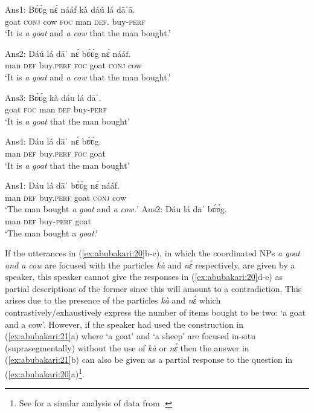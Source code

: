 \documentclass[output=paper,modfonts,nonflat,
\ChapterDOI{10.5281/zenodo.3367154}
 hidelinks
]{langsci/langscibook}
\begin{document}
\ex\label{ex:abubakari:20b}
Ans1: \gll Bʋ́ʋ́g  nɛ́  nááf  kà  dáú  lá  dāˈā.\\
goat    \textsc{conj}  cow  \textsc{foc}  man  \textsc{def}.  buy-\textsc{perf}\\
\glt ‘It is \textit{a} \textit{goat} and \textit{a} \textit{cow} that the man bought.’

\ex\label{ex:abubakari:20c}
Ans2: \gll Dáú  lá  dāˈ    nɛ́  bʋ́ʋ́g  nɛ́  nááf.\\
man  \textsc{def}  buy.\textsc{perf}  \textsc{foc}  goat  \textsc{conj}  cow \\
\glt ‘It is \textit{a} \textit{goat} and \textit{a} \textit{cow} that the man bought.’

\ex\label{ex:abubakari:20d}
Ans3: \gll {\#}Bʋ́ʋ́g  kà  dáu  lá  dāˈ.\\ 
goat    \textsc{foc}  man  \textsc{def}  buy-\textsc{perf}\\                           
\glt ‘It is \textit{a goat} that the man bought’          

\ex\label{ex:abubakari:20e}
Ans4: \gll {\#}Dáu  lá  dāˈ    nɛ́  bʋ́ʋ́g.\\   
man  \textsc{def}  buy.\textsc{perf}  \textsc{foc}  goat\\
\glt ‘It is \textit{a} \textit{goat} that the man bought’
\z
\z

\ea\label{ex:abubakari:21}
\ea\label{ex:abubakari:21a}
Ans1: \gll Dáu  lá  dāˈ    bʋ́ʋ́g  nɛ́  nááf.\\
man  \textsc{def}  buy.\textsc{perf}  goat  \textsc{conj}  cow\\                 
\glt ‘The man bought \textit{a} \textit{goat} and \textit{a} \textit{cow.}’     
\ex\label{ex:abubakari:21b}
Ans2: \gll Dáu  lá  dāˈ    bʋ́ʋ́g.\\  
man  \textsc{def}  buy-\textsc{perf}  goat\\  
\glt ‘The man bought {a} \textit{goat}.’
\z
\z

If the utterances in (\ref{ex:abubakari:20}b-c), in which the coordinated NPs \textit{a goat and a cow} are focused with the particles \textit{kà} and \textit{nɛ́} respectively, are given by a speaker, this speaker cannot give the responses in (\ref{ex:abubakari:20}d-e) as partial descriptions of the former since this will amount to a contradiction. This arises due to the presence of the particles \textit{kà} and \textit{nɛ́} which contrastively{\slash}exhaustively express the number of items bought to be two: 
`a goat and a cow'. However, if the speaker had used the construction in (\ref{ex:abubakari:21}a) where `a goat' and `a sheep' are focused in-situ (suprasegmentally) without the use of \textit{kà} or \textit{nɛ́} then the answer in (\ref{ex:abubakari:21}b) can also be given as a partial response to the question in (\ref{ex:abubakari:20}a)\footnote{See \citet{duah2015} for a similar analysis of data from .}. 
\end{document}
